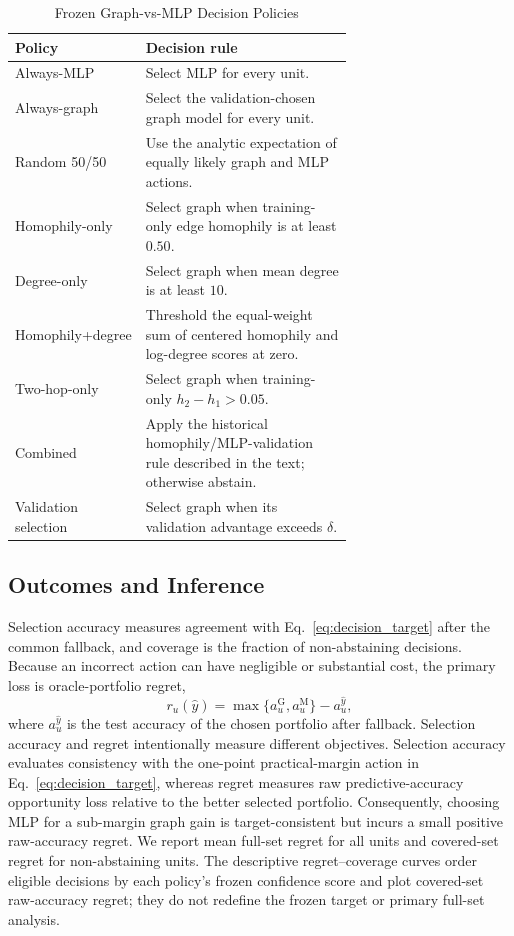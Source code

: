 \begin{table}[t]
\centering
\caption{Frozen Graph-vs-MLP Decision Policies}
\label{tab:diagnostic_policies}
\small
\begin{tabular}{@{}lp{0.67\linewidth}@{}}
\toprule
Policy & Decision rule \\
\midrule
Always-MLP & Select MLP for every unit. \\
Always-graph & Select the validation-chosen graph model for every unit. \\
Random 50/50 & Use the analytic expectation of equally likely graph and MLP actions. \\
Homophily-only & Select graph when training-only edge homophily is at least $0.50$. \\
Degree-only & Select graph when mean degree is at least $10$. \\
Homophily+degree & Threshold the equal-weight sum of centered homophily and log-degree scores at zero. \\
Two-hop-only & Select graph when training-only $h_2-h_1>0.05$. \\
Combined & Apply the historical homophily/MLP-validation rule described in the text; otherwise abstain. \\
Validation selection & Select graph when its validation advantage exceeds $\delta$. \\
\bottomrule
\end{tabular}
\end{table}

\subsection{Outcomes and Inference}

Selection accuracy measures agreement with Eq.~\eqref{eq:decision_target} after the common fallback, and coverage is the fraction of non-abstaining decisions. Because an incorrect action can have negligible or substantial cost, the primary loss is oracle-portfolio regret,
\begin{equation}
r_u(\widehat{y})=\max\{a_u^{\mathrm{G}},a_u^{\mathrm{M}}\}-a_u^{\widehat{y}},
\label{eq:oracle_regret}
\end{equation}
where $a_u^{\widehat{y}}$ is the test accuracy of the chosen portfolio after fallback. Selection accuracy and regret intentionally measure different objectives. Selection accuracy evaluates consistency with the one-point practical-margin action in Eq.~\eqref{eq:decision_target}, whereas regret measures raw predictive-accuracy opportunity loss relative to the better selected portfolio. Consequently, choosing MLP for a sub-margin graph gain is target-consistent but incurs a small positive raw-accuracy regret. We report mean full-set regret for all units and covered-set regret for non-abstaining units. The descriptive regret--coverage curves order eligible decisions by each policy's frozen confidence score and plot covered-set raw-accuracy regret; they do not redefine the frozen target or primary full-set analysis.

